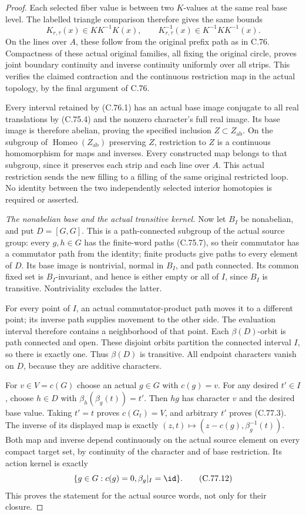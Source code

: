 \begin{proof}
Each selected fiber value is between two $K$-values
at the same real base level. The labelled triangle
comparison therefore gives the same bounds
\[
         K_{r,\tau}(x)\in K K^{-1}K(x),\qquad
         K_{r,\tau}^{-1}(x)\in K^{-1}K K^{-1}(x).
                                                               \tag{C.77.11}
\]
On the lines over $A$, these follow from the original
prefix path as in C.76. Compactness of these actual
original families, all fixing the original circle,
proves joint boundary continuity and inverse continuity
uniformly over all strips. This verifies the claimed
contraction and the continuous restriction map in the
actual topology, by the final argument of C.76.

Every interval retained by (C.76.1) has an actual base
image conjugate to all real translations by (C.75.4)
and the nonzero character's full real image. Its base
image is therefore abelian, proving the specified
inclusion $Z\subset Z_{\mathrm{ab}}$. On the subgroup
of $\operatorname{Homeo}(Z_{\mathrm{ab}})$ preserving
$Z$, restriction to $Z$ is a continuous homomorphism
for maps and inverses. Every constructed map belongs
to that subgroup, since it preserves each strip and
each line over $A$. This actual restriction sends
the new filling to a filling of the same original
restricted loop. No identity between the two
independently selected interior homotopies is
required or asserted.

\emph{The nonabelian base and the actual transitive kernel.}
Now let $B_I$ be nonabelian, and put $D=[G,G]$.
This is a path-connected subgroup of the actual
source group: every $g,h\in G$ has the finite-word
paths (C.75.7), so their commutator has a commutator
path from the identity; finite products give paths
to every element of $D$. Its base image is nontrivial,
normal in $B_I$, and path connected. Its common
fixed set is $B_I$-invariant, and hence is either
empty or all of $I$, since $B_I$ is transitive.
Nontriviality excludes the latter.

For every point of $I$, an actual commutator-product
path moves it to a different point; its inverse
path supplies movement to the other side. The
evaluation interval therefore contains a neighborhood
of that point. Each $\beta(D)$-orbit is path connected
and open. These disjoint orbits partition the
connected interval $I$, so there is exactly one.
Thus $\beta(D)$ is transitive. All endpoint characters
vanish on $D$, because they are additive characters.

For $v\in V=c(G)$ choose an actual $g\in G$ with
$c(g)=v$. For any desired $t'\in I$, choose $h\in D$
with $\beta_h(\beta_g(t))=t'$. Then $hg$ has character
$v$ and the desired base value. Taking $t'=t$ proves
$c(G_t)=V$, and arbitrary $t'$ proves (C.77.3).
The inverse of its displayed map is exactly
$(z,t)\mapsto(z-c(g),\beta_g^{-1}(t))$.
Both map and inverse depend continuously on the
actual source element on every compact target set,
by continuity of the character and of base restriction.
Its action kernel is exactly
\[
             \{g\in G:c(g)=0, \beta_g|_I=\id\}.
                                                               \tag{C.77.12}
\]
This proves the statement for the actual source words,
not only for their closure.


\end{proof}
